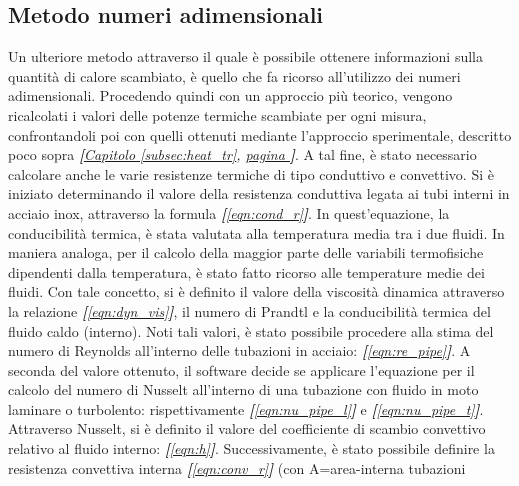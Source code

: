 \documentclass[a4paper,10pt]{article}                                                                                       %
\begin{document}
\subsection{Metodo numeri adimensionali}                                                                                    %
\label{subsec:adimnum_meth}                                                                                                 %
  Un ulteriore metodo attraverso il quale è possibile ottenere informazioni sulla quantità di calore scambiato, è quello
  che fa ricorso all'utilizzo dei numeri adimensionali. Procedendo quindi con un approccio più teorico, vengono
  ricalcolati i valori delle potenze termiche scambiate per ogni misura, confrontandoli poi con quelli ottenuti mediante
  l'approccio sperimentale, descritto poco sopra \textit{\textbf{[}\hyperref[subsec:heat_tr]{Capitolo }\ref{subsec:heat_tr},
  \hyperref[subsec:heat_tr]{pagina }\pageref{subsec:heat_tr}\textbf{]}}. A tal fine, è stato necessario calcolare anche le
  varie resistenze termiche di tipo conduttivo e convettivo. Si è iniziato determinando il valore della resistenza
  conduttiva legata ai tubi interni in acciaio inox, attraverso la formula \textit{\textbf{[}\ref{eqn:cond_r}\textbf{]}}.
  In quest'equazione, la conducibilità termica, è stata valutata alla temperatura media tra i due fluidi. In maniera
  analoga, per il calcolo della maggior parte delle variabili termofisiche dipendenti dalla temperatura, è stato fatto
  ricorso alle temperature medie dei fluidi. Con tale concetto, si è definito il valore della viscosità dinamica attraverso
  la relazione \textit{\textbf{[}\ref{eqn:dyn_vis}\textbf{]}}, il numero di Prandtl e la conducibilità termica del fluido
  caldo (interno). Noti tali valori, è stato possibile procedere alla stima del numero di Reynolds all'interno delle
  tubazioni in acciaio: \textit{\textbf{[}\ref{eqn:re_pipe}\textbf{]}}. A seconda del valore ottenuto, il software decide
  se applicare l'equazione per il calcolo del numero di Nusselt all'interno di una tubazione con fluido in moto laminare
  o turbolento: rispettivamente \textit{\textbf{[}\ref{eqn:nu_pipe_l}\textbf{]}} e
  \textit{\textbf{[}\ref{eqn:nu_pipe_t}\textbf{]}}. Attraverso Nusselt, si è definito il valore del coefficiente di scambio
  convettivo relativo al fluido interno: \textit{\textbf{[}\ref{eqn:h}\textbf{]}}. Successivamente, è stato possibile
  definire la resistenza convettiva interna \textit{\textbf{[}\ref{eqn:conv_r}\textbf{]}} (con A=area-interna tubazioni
\end{document}
